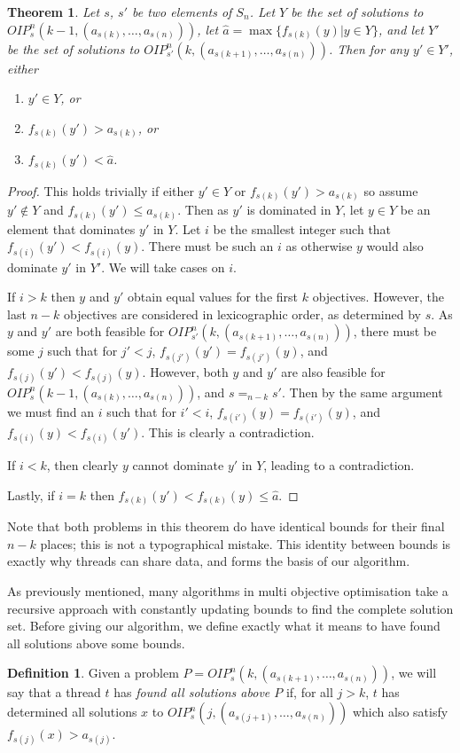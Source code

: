 \documentclass{amsart}
\newtheorem{theorem}{Theorem}
\theoremstyle{definition}
\newtheorem{dfn}{Definition}
\begin{document}
\begin{theorem}\label{thm:new-recurse}
  Let $s$, $s'$ be two elements of $S_n$.
  Let $Y$ be the set of solutions to ${O\!I\!P}_s^n(k-1, (a_{s(k)},\dots,a_{s(n)}))$, let $\hat a = \max\{f_{s(k)}(y) | y\in Y\}$, and
  let $Y'$ be the set of solutions to ${O\!I\!P}_{s'}^n(k, (a_{s(k+1)},\dots,\allowbreak a_{s(n)}))$.
Then for any $y' \in Y'$, either
\begin{enumerate}
  \item $y' \in Y$, or 
  \item $f_{s(k)}(y') > a_{s(k)}$, or 
  \item $f_{s(k)}(y') < \hat a$.
\end{enumerate}
\end{theorem}

\begin{proof}
  This holds trivially if either $y' \in Y$ or $f_{s(k)}(y') > a_{s(k)}$ so assume $y' \not\in Y$ and $f_{s(k)}(y') \leq a_{s(k)}$.
Then as $y'$ is dominated in $Y$, let $y \in Y$ be an element that dominates $y'$ in $Y$.
Let $i$ be the smallest integer such that $f_{s(i)}(y') < f_{s(i)}(y)$.
There must be such an $i$ as otherwise $y$ would also dominate $y'$ in $Y'$.
We will take cases on $i$.

If $i > k$ then $y$ and $y'$ obtain equal values for the first $k$ objectives.
However, the last $n-k$ objectives are considered in lexicographic order, as determined by $s$.
As $y$ and $y'$ are both feasible for ${O\!I\!P}^n_{s'}(k, (a_{s(k+1)},\dots,a_{s(n)}))$, there must be some $j$ such that for $j' < j$, $f_{s(j')}(y') = f_{s(j')}(y)$, and $f_{s(j)}(y') < f_{s(j)}(y)$.
However, both $y$ and $y'$ are also feasible for ${O\!I\!P}^n_s(k-1, (a_{s(k)},\dots,a_{s(n)}))$, and $s =_{n-k} s'$.
Then by the same argument we must find an $i$ such that for $i' < i$, $f_{s(i')}(y) = f_{s(i')}(y)$, and $f_{s(i)}(y) < f_{s(i)}(y')$. This is clearly a contradiction.

If $i < k$, then clearly $y$ cannot dominate $y'$ in $Y$, leading to a contradiction.

Lastly, if $i = k$ then $f_{s(k)}(y') < f_{s(k)}(y) \leq \hat a$.
\end{proof}

Note that both problems in this theorem do have identical bounds for their final $n-k$ places; this is not a typographical mistake. 
This identity between bounds is exactly why threads can share data, and forms the basis of our algorithm.

As previously mentioned, many algorithms in multi objective optimisation take a recursive approach with constantly updating bounds to find the complete solution set.
Before giving our algorithm, we define exactly what it means to have found all solutions above some bounds.
\begin{dfn}\label{dfn:above}
  Given a problem $P = {O\!I\!P}^n_s(k, (a_{s(k+1)},\dots,a_{s(n)}))$, we will say that a thread $t$ has {\em found all solutions above $P$} if, for all $j > k$, $t$ has determined all solutions $x$ to ${O\!I\!P}^n_s(j, (a_{s(j+1)},\dots,a_{s(n)}))$ which also satisfy $f_{s(j)}(x) > a_{s(j)}$.
\end{dfn}
\end{document}
